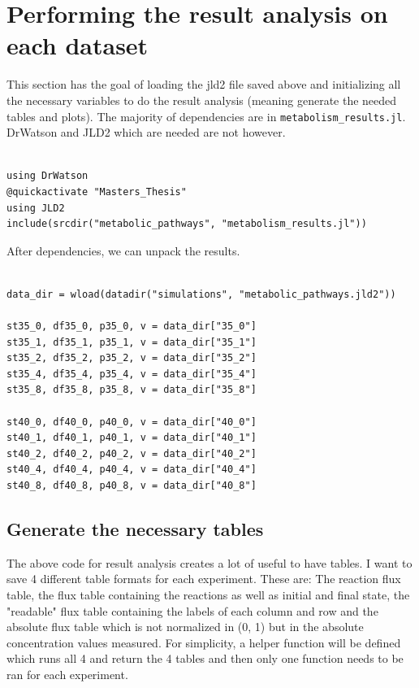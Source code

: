 \documentclass[11pt]{article}
\begin{document}
\section{Performing the result analysis on each dataset}
\label{sec:org81b5e4d}
This section has the goal of loading the jld2 file saved above and initializing all the necessary variables to do the result analysis (meaning generate the needed tables and plots). The majority of dependencies are in \texttt{metabolism\_results.jl}. DrWatson and JLD2 which are needed are not however.

\begin{verbatim}

using DrWatson
@quickactivate "Masters_Thesis"
using JLD2
include(srcdir("metabolic_pathways", "metabolism_results.jl"))
\end{verbatim}

After dependencies, we can unpack the results.

\begin{verbatim}

data_dir = wload(datadir("simulations", "metabolic_pathways.jld2"))

st35_0, df35_0, p35_0, v = data_dir["35_0"]
st35_1, df35_1, p35_1, v = data_dir["35_1"]
st35_2, df35_2, p35_2, v = data_dir["35_2"]
st35_4, df35_4, p35_4, v = data_dir["35_4"]
st35_8, df35_8, p35_8, v = data_dir["35_8"]

st40_0, df40_0, p40_0, v = data_dir["40_0"]
st40_1, df40_1, p40_1, v = data_dir["40_1"]
st40_2, df40_2, p40_2, v = data_dir["40_2"]
st40_4, df40_4, p40_4, v = data_dir["40_4"]
st40_8, df40_8, p40_8, v = data_dir["40_8"]
\end{verbatim}

\subsection{Generate the necessary tables}
\label{sec:org0a41a36}
The above code for result analysis creates a lot of useful to have tables. I want to save 4 different table formats for each experiment. These are: The reaction flux table, the flux table containing the reactions as well as initial and final state, the "readable" flux table containing the labels of each column and row and the absolute flux table which is not normalized in (0, 1) but in the absolute concentration values measured. For simplicity, a helper function will be defined which runs all 4 and return the 4 tables and then only one function needs to be ran for each experiment.
\end{document}
